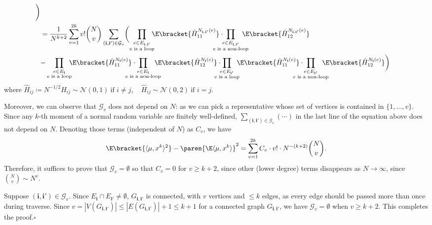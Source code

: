 \documentclass{homework}
\begin{document}
{\begin{align*}
        \biggr)
    \\ &= \frac 1 {N^{k + 2}} \sum_{v=1}^{2k} v!\binom N v \sum_{(\mathbf i,\mathbf i') \in \mathcal G_v} \biggl(
        \prod_{\substack{e\in E_{\mathbf i,\mathbf i'} \\ \text{$e$ is a loop}}}\mkern-10mu \E\bracket{ \hat H_{11}^{N_{\mathbf i,\mathbf i'} (e)} }\cdot \mkern-30mu\prod_{\substack{e\in E_{\mathbf i,\mathbf i'} \\ \text{$e$ is a non-loop}}} \mkern-20mu\E\bracket{ \hat H_{12}^{N_{\mathbf i,\mathbf i'} (e)} } \biggr.
        \\&\biggl. - 
        \prod_{\substack{e\in E_{\mathbf i} \\ \text{$e$ is a loop}}} \mkern-10mu\E\bracket{ \hat H_{11}^{N_{\mathbf i} (e)} }\cdot \mkern-30mu\prod_{\substack{e\in E_{\mathbf i} \\ \text{$e$ is a non-loop}}} \mkern-20mu\E\bracket{ \hat H_{12}^{N_{\mathbf i} (e)} }\cdot \mkern-20mu
        \prod_{\substack{e\in E_{\mathbf i'} \\ \text{$e$ is a loop}}}\mkern-10mu \E\bracket{ \hat H_{11}^{N_{\mathbf i} (e)} }\cdot \mkern-30mu\prod_{\substack{e\in E_{\mathbf i'} \\ \text{$e$ is a non-loop}}} \mkern-20mu\E\bracket{ \hat H_{12}^{N_{\mathbf i} (e)} }
        \biggr)
\end{align*}
where $\hat H_{ij} \coloneqq N^{-1/2}H_{ij}\sim \mathcal N(0,1)\ \text{if $i\ne j$}, \quad\hat H_{ij} \sim \mathcal N(0,2)\ \text{if $i=j$}$.

Moreover, we can observe that $\mathcal G_v$ does not depend on $N$: as we can pick a representative whose set of vertices is contained in $\{1,\dots,v\}$. Since any $k$-th moment of a normal random variable are finitely well-defined, $\sum_{(\mathbf i,\mathbf i')\in \mathcal G_v} (\cdots)$ in the last line of the equation above does not depend on $N$. Denoting those terms (independent of $N$) as $C_v$, we have
$$ \E\bracket{\langle{\mu, x^k}\rangle^2} - \paren{\E\langle{\mu,x^k}\rangle}^2 = \sum_{v=1}^{2k} C_v\cdot v!\cdot N^{-(k+2)}\binom N v. $$
Therefore, it suffices to prove that $\mathcal G_v = \emptyset$ so that $C_v = 0$ for $v\ge k+2$, since other (lower degree) terms disappears as $N\to \infty$, since $\binom N v \sim N^{v}$.

Suppose $(\mathbf i, \mathbf i') \in \mathcal G_v$. Since $E_{\mathbf i} \cap E_{\mathbf i'}\ne\emptyset$, $G_{\mathbf i,\mathbf i'}$ is connected, with $v$ vertices and $\le k$ edges, as every edge should be passed more than once during traverse. Since $v = |V(G_{\mathbf i,\mathbf i'})| \le |E(G_{\mathbf i,\mathbf i'})| + 1 \le k+1$ for a connected graph $G_{\mathbf i,\mathbf i'}$, we have $\mathcal G_v = \emptyset$ when $v \ge k+2$. This completes the proof.\hfill $\square$
}
\end{document}
